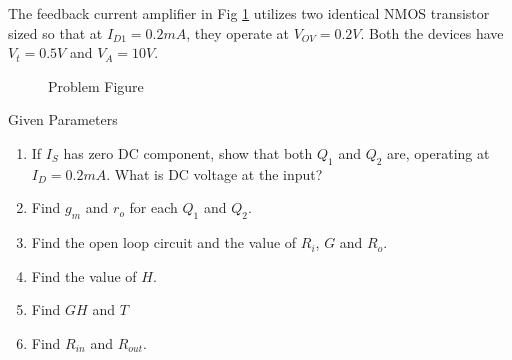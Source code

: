 The feedback current amplifier in Fig \ref{fig:ee18btech11038_probfig} utilizes two identical NMOS transistor sized so that at $I_{D1} = 0.2mA$, they operate at $V_{OV} = 0.2V$. Both the devices have $V_{t} =0.5V$ and $V_{A} = 10V$.
\begin{figure}[!ht]
	\begin{center}
		
		\resizebox{\columnwidth}{!}{}
	\end{center}
\caption{Problem Figure}
\label{fig:ee18btech11038_probfig}
\end{figure}
\begin{table}[!ht]
\centering

\caption{Given Parameters}
\label{table: given}
\end{table}

\begin{enumerate}[label=(\alph*)]

\item  If $I_{S}$ has zero DC component, show that both $Q_{1}$ and $Q_{2}$ are, operating at $I_{D} = 0.2mA$. What is DC voltage at the input?
\\
\item Find $g_{m}$ and $r_{o}$ for each $Q_{1}$ and $Q_{2}$.
\\
\item  Find the open loop circuit and the value of $R_{i}$, $G$ and $R_{o}$.
\\
\item  Find the value of $H$.
\\
\item  Find $GH$ and $T$
\\
\item Find $R_{in}$ and $R_{out}$.
\end{enumerate}


